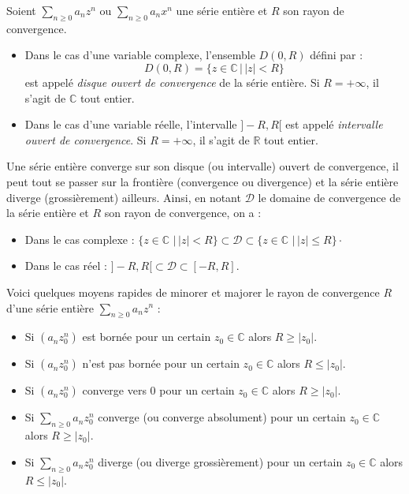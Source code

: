 \documentclass[a4paper,10pt]{report}
\newcommand{\Sum}[2]{\ensuremath{\textstyle{\sum\limits_{#1}^{#2}}}}
\begin{document}
\begin{defin} Soient $\Sum{n \geq 0}{} a_n z^n$ ou $\Sum{n \geq 0}{} a_n x^n$ une série entière et $R$ son rayon de convergence.

\begin{itemize}
\item Dans le cas d'une variable complexe, l'ensemble $D(0,R)$ défini par :
$$ D(0,R)= \lbrace z \in \mathbb{C} \, \vert \, \vert z \vert < R \rbrace$$
est appelé \textit{disque ouvert de convergence} de la série entière. Si $R = + \infty$, il s'agit de $\mathbb{C}$ tout entier.
\item Dans le cas d'une variable réelle, l'intervalle $]-R,R[$ est appelé \textit{intervalle ouvert de convergence}. Si $R = + \infty$, il s'agit de $\mathbb{R}$ tout entier.
\end{itemize}
\end{defin}

\begin{retenir} Une série entière converge sur son disque (ou intervalle) ouvert de convergence, il peut tout se passer sur la frontière (convergence ou divergence) et la série entière diverge (grossièrement) ailleurs. Ainsi, en notant $\mathcal{D}$ le domaine de convergence de la série entière et $R$ son rayon de convergence, on a :
\begin{itemize}
\item Dans le cas complexe : $\lbrace z \in \mathbb{C} \, \, \vert \, \vert z \vert < R \rbrace \subset \mathcal{D} \subset \lbrace z \in \mathbb{C} \, \, \vert \, \vert z \vert \leq R \rbrace\cdot$
\item Dans le cas réel : $]-R,R[ \subset \mathcal{D} \subset [-R,R]$.
\end{itemize}
\end{retenir}



\noindent Voici quelques moyens rapides de minorer et majorer le rayon de convergence $R$ d'une série entière $\Sum{n \geq 0}{} a_n z^n$ :

\begin{itemize}
\item Si $(a_n z_0^n)$ est bornée pour un certain $z_0 \in \mathbb{C}$ alors $R \geq \vert z_0 \vert$.
\item Si $(a_n z_0^n)$ n'est pas bornée pour un certain $z_0 \in \mathbb{C}$ alors $R \leq \vert z_0 \vert$.
\item Si $(a_n z_0^n)$ converge vers $0$ pour un certain $z_0 \in \mathbb{C}$ alors $R \geq \vert z_0 \vert$.
\item Si $\Sum{n \geq 0}{} a_n z_0^n$ converge (ou converge absolument) pour un certain $z_0 \in \mathbb{C}$ alors $R \geq \vert z_0 \vert$.
\item Si $\Sum{n \geq 0}{} a_n z_0^n$ diverge (ou diverge grossièrement) pour un certain $z_0 \in \mathbb{C}$ alors $R \leq \vert z_0 \vert$.
\end{itemize}
\end{document}
